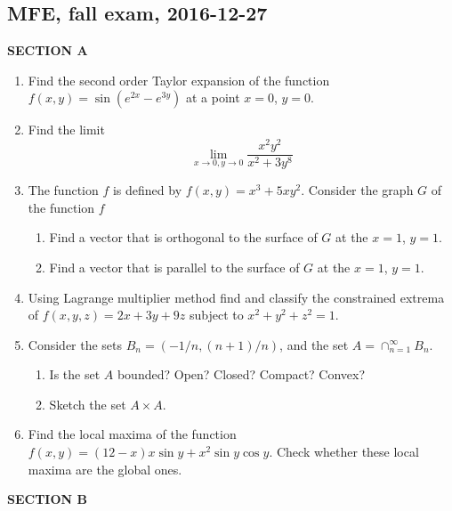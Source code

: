 \documentclass[12pt]{article} %
\theoremstyle{definition} %
\begin{document}
\subsection{MFE, fall exam, 2016-12-27}


\textbf{SECTION A}

\begin{enumerate}


\item Find the second order Taylor expansion of the function $f(x, y) = \sin( e^{2x} - e^{3y})$ at a point $x = 0$, $y=0$.


\item Find the limit
\[
\lim_{x \to 0, y \to 0} \frac{x^2 y^2}{x^2 + 3y^8}
\]


\item The function $f$ is defined by $f(x, y) = x^3 + 5xy^2$. Consider the graph $G$ of the function $f$
\begin{enumerate}
  \item Find a vector that is orthogonal to the surface of $G$ at the $x=1$, $y=1$.
  \item Find a vector that is parallel to the surface of $G$ at the $x=1$, $y=1$.
\end{enumerate}

\item Using Lagrange multiplier method find and classify the constrained extrema of $f(x, y, z) =  2x +3y + 9z$ subject to $x^2 + y^2 + z^2 = 1$.


\item Consider the sets $B_n = \left(-1/n, (n+1)/n \right)$, and the set $A = \cap_{n=1}^{\infty} B_n$.
\begin{enumerate}
\item Is the set $A$ bounded? Open? Closed? Compact? Convex?
\item Sketch the set $A \times A$.
\end{enumerate}

\item Find the local maxima of the function $f(x, y) =  (12 - x) x \sin y + x^2 \sin y \cos y$. 
Check whether these local maxima are the global ones.


\end{enumerate}

\textbf{SECTION B}
\end{document}
